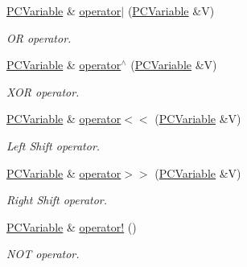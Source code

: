 \begin{DoxyCompactItemize}
\hyperlink{classpc__emulator_1_1PCVariable}{P\+C\+Variable} \& \hyperlink{classpc__emulator_1_1PCVariable_a3c69b9f21e8ccf94dd6b855b3803545a}{operator$\vert$} (\hyperlink{classpc__emulator_1_1PCVariable}{P\+C\+Variable} \&V)
\begin{DoxyCompactList}\small\item\em OR operator. \end{DoxyCompactList}\item 
\hyperlink{classpc__emulator_1_1PCVariable}{P\+C\+Variable} \& \hyperlink{classpc__emulator_1_1PCVariable_a7284a3ced8ec7829a9617e3236be7fbf}{operator$^\wedge$} (\hyperlink{classpc__emulator_1_1PCVariable}{P\+C\+Variable} \&V)
\begin{DoxyCompactList}\small\item\em X\+OR operator. \end{DoxyCompactList}\item 
\hyperlink{classpc__emulator_1_1PCVariable}{P\+C\+Variable} \& \hyperlink{classpc__emulator_1_1PCVariable_a77f2a7facfd70de81303125741f32a24}{operator$<$$<$} (\hyperlink{classpc__emulator_1_1PCVariable}{P\+C\+Variable} \&V)
\begin{DoxyCompactList}\small\item\em Left Shift operator. \end{DoxyCompactList}\item 
\hyperlink{classpc__emulator_1_1PCVariable}{P\+C\+Variable} \& \hyperlink{classpc__emulator_1_1PCVariable_aa2978c98699b28b96f86eeb3f2bc0519}{operator$>$$>$} (\hyperlink{classpc__emulator_1_1PCVariable}{P\+C\+Variable} \&V)
\begin{DoxyCompactList}\small\item\em Right Shift operator. \end{DoxyCompactList}\item 
\hyperlink{classpc__emulator_1_1PCVariable}{P\+C\+Variable} \& \hyperlink{classpc__emulator_1_1PCVariable_a742f5274d1318952db01c17a7c0a13d7}{operator!} ()
\begin{DoxyCompactList}\small\item\em N\+OT operator. \end{DoxyCompactList}\end{DoxyCompactItemize}
